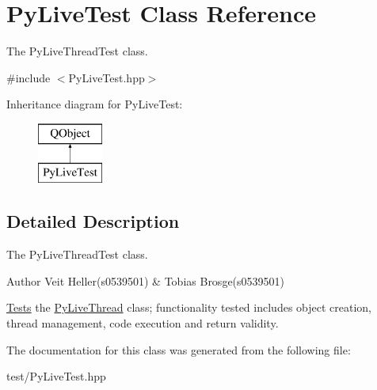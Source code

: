 \hypertarget{classPyLiveTest}{\section{Py\+Live\+Test Class Reference}
\label{classPyLiveTest}
}


The Py\+Live\+Thread\+Test class.  




{\ttfamily \#include $<$Py\+Live\+Test.\+hpp$>$}

Inheritance diagram for Py\+Live\+Test\+:\begin{figure}[H]
\begin{center}
\leavevmode
\includegraphics[height=2.000000cm]{classPyLiveTest}
\end{center}
\end{figure}


\subsection{Detailed Description}
The Py\+Live\+Thread\+Test class. 

\begin{DoxyAuthor}{Author}
Veit Heller(s0539501) \& Tobias Brosge(s0539501)
\end{DoxyAuthor}
\hyperlink{structTests}{Tests} the \hyperlink{classPyLiveThread}{Py\+Live\+Thread} class; functionality tested includes object creation, thread management, code execution and return validity. 

The documentation for this class was generated from the following file\+:\begin{DoxyCompactItemize}
\item 
test/Py\+Live\+Test.\+hpp\end{DoxyCompactItemize}
